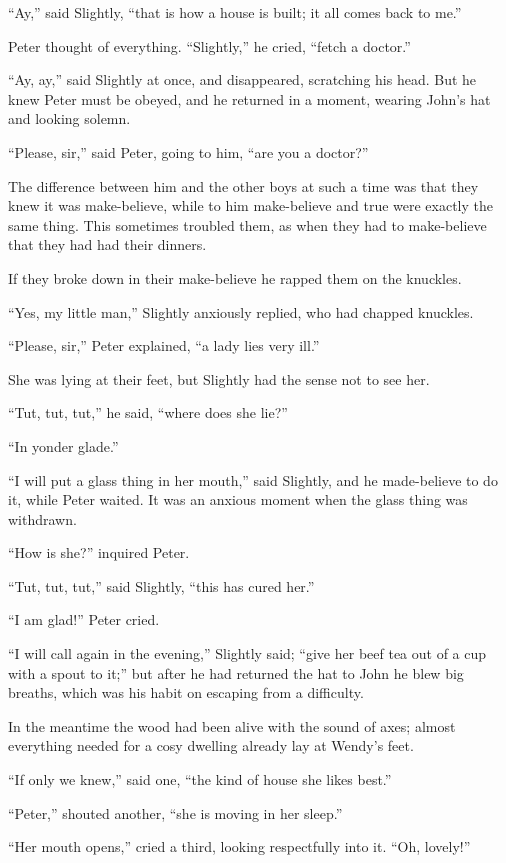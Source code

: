 ``Ay,'' said Slightly, ``that is how a house is built; it all comes back
to me.''

Peter thought of everything. ``Slightly,'' he cried, ``fetch a doctor.''

``Ay, ay,'' said Slightly at once, and disappeared, scratching his head.
But he knew Peter must be obeyed, and he returned in a moment, wearing John's
hat and looking solemn.

``Please, sir,'' said Peter, going to him, ``are you a doctor?''

The difference between him and the other boys at such a time was that they knew
it was make-believe, while to him make-believe and true were exactly the same
thing.
This sometimes troubled them, as when they had to make-believe that they had had
their dinners.

If they broke down in their make-believe he rapped them on the knuckles.

``Yes, my little man,'' Slightly anxiously replied, who had chapped knuckles.

``Please, sir,'' Peter explained, ``a lady lies very ill.''

She was lying at their feet, but Slightly had the sense not to see her.

``Tut, tut, tut,'' he said, ``where does she lie?''

``In yonder glade.''

``I will put a glass thing in her mouth,'' said Slightly, and he made-believe to
do it, while Peter waited.
It was an anxious moment when the glass thing was withdrawn.

``How is she?'' inquired Peter.

``Tut, tut, tut,'' said Slightly, ``this has cured her.''

``I am glad!'' Peter cried.

``I will call again in the evening,'' Slightly said; ``give her beef tea out of
a cup with a spout to it;'' but after he had returned the hat to John he blew
big breaths, which was his habit on escaping from a difficulty.

In the meantime the wood had been alive with the sound of axes; almost
everything needed for a cosy dwelling already lay at Wendy's feet.

``If only we knew,'' said one, ``the kind of house she likes best.''

``Peter,'' shouted another, ``she is moving in her sleep.''

``Her mouth opens,'' cried a third, looking respectfully into it.
``Oh, lovely!''

